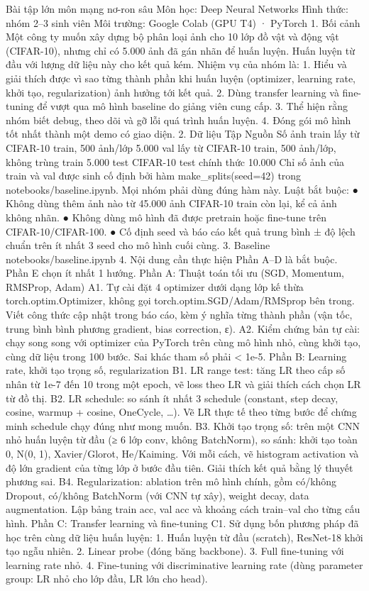 Bài tập lớn môn mạng nơ-ron sâu
Môn học: Deep Neural Networks
Hình thức: nhóm 2–3 sinh viên
Môi trường: Google Colab (GPU T4) · PyTorch
1. Bối cảnh
Một công ty muốn xây dựng bộ phân loại ảnh cho 10 lớp đồ vật và động vật (CIFAR-10),
nhưng chỉ có 5.000 ảnh đã gán nhãn để huấn luyện. Huấn luyện từ đầu với lượng dữ liệu
này cho kết quả kém. Nhiệm vụ của nhóm là:
1. Hiểu và giải thích được vì sao từng thành phần khi huấn luyện (optimizer, learning rate,
khởi tạo, regularization) ảnh hưởng tới kết quả.
2. Dùng transfer learning và fine-tuning để vượt qua mô hình baseline do giảng viên cung
cấp.
3. Thể hiện rằng nhóm biết debug, theo dõi và gỡ lỗi quá trình huấn luyện.
4. Đóng gói mô hình tốt nhất thành một demo có giao diện.
2. Dữ liệu
Tập Nguồn Số ảnh
train lấy từ CIFAR-10 train, 500 ảnh/lớp 5.000
val lấy từ CIFAR-10 train, 500
ảnh/lớp, không trùng train
5.000
test CIFAR-10 test chính thức 10.000
Chỉ số ảnh của train và val được sinh cố định bởi hàm make_splits(seed=42)
trong notebooks/baseline.ipynb. Mọi nhóm phải dùng đúng hàm này.
Luật bắt buộc:
● Không dùng thêm ảnh nào từ 45.000 ảnh CIFAR-10 train còn lại, kể cả ảnh không nhãn.
● Không dùng mô hình đã được pretrain hoặc fine-tune trên CIFAR-10/CIFAR-100.
● Cố định seed và báo cáo kết quả trung bình ± độ lệch chuẩn trên ít nhất 3 seed cho mô
hình cuối cùng.
3. Baseline
notebooks/baseline.ipynb
4. Nội dung cần thực hiện
Phần A–D là bắt buộc. Phần E chọn ít nhất 1 hướng.
Phần A: Thuật toán tối ưu (SGD, Momentum, RMSProp, Adam)
A1. Tự cài đặt 4 optimizer dưới dạng lớp kế thừa torch.optim.Optimizer, không gọi
torch.optim.SGD/Adam/RMSprop bên trong. Viết công thức cập nhật trong báo cáo,
kèm ý nghĩa từng thành phần (vận tốc, trung bình bình phương gradient, bias correction, ε).
A2. Kiểm chứng bản tự cài: chạy song song với optimizer của PyTorch trên cùng mô hình
nhỏ, cùng khởi tạo, cùng dữ liệu trong 100 bước. Sai khác tham số phải < 1e-5.
Phần B: Learning rate, khởi tạo trọng số, regularization
B1. LR range test: tăng LR theo cấp số nhân từ 1e-7 đến 10 trong một epoch, vẽ loss theo
LR và giải thích cách chọn LR từ đồ thị.
B2. LR schedule: so sánh ít nhất 3 schedule (constant, step decay, cosine, warmup + cosine,
OneCycle, …). Vẽ LR thực tế theo từng bước để chứng minh schedule chạy đúng như mong
muốn.
B3. Khởi tạo trọng số: trên một CNN nhỏ huấn luyện từ đầu (≥ 6 lớp conv, không
BatchNorm), so sánh: khởi tạo toàn 0, N(0, 1), Xavier/Glorot, He/Kaiming. Với mỗi cách,
vẽ histogram activation và độ lớn gradient của từng lớp ở bước đầu tiên. Giải thích kết quả
bằng lý thuyết phương sai.
B4. Regularization: ablation trên mô hình chính, gồm có/không Dropout, có/không
BatchNorm (với CNN tự xây), weight decay, data augmentation. Lập bảng train acc, val acc
và khoảng cách train–val cho từng cấu hình.
Phần C: Transfer learning và fine-tuning
C1. Sử dụng bốn phương pháp đã học trên cùng dữ liệu huấn luyện:
1. Huấn luyện từ đầu (scratch), ResNet-18 khởi tạo ngẫu nhiên.
2. Linear probe (đóng băng backbone).
3. Full fine-tuning với learning rate nhỏ.
4. Fine-tuning với discriminative learning rate (dùng parameter group: LR nhỏ cho lớp
đầu, LR lớn cho head).

